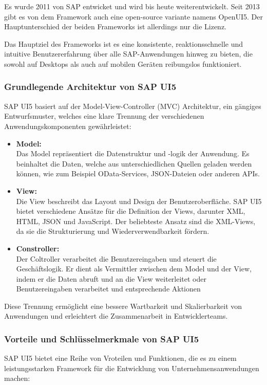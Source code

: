 Es wurde 2011 von SAP entwicket und wird bis heute weiterentwickelt. Seit 2013 gibt es von dem Framework auch eine open-source variante namens OpenUI5. Der Hauptunterschied der beiden Frameworks ist allerdings nur die Lizenz.

Das Hauptziel des Frameworks ist es eine konsistente, reaktionsschnelle und intuitive Benutzererfahrung über alle SAP-Anwendungen hinweg zu bieten, die sowohl auf Desktops als auch auf mobilen Geräten reibungslos funktioniert.

\subsubsection[Grundlegende Architektur von SAP UI5]{Grundlegende Architektur von SAP UI5}
SAP UI5 basiert auf der Model-View-Controller (MVC) Architektur, ein gängiges Entwurfsmuster, welches eine klare Trennung der verschiedenen Anwendungskomponenten gewährleistet:
\begin{itemize}
    \item \textbf{Model:} \\
    Das Model repräsentiert die Datenstruktur und -logik der Anwendung. Es beinhaltet die Daten, welche aus unterschiedlichen Quellen geladen werden können, wie zum Beispiel OData-Services, JSON-Dateien oder anderen APIs.
    \item \textbf{View:} \\
    Die View beschreibt das Layout und Design der Benutzeroberfläche. SAP UI5 bietet verschiedene Ansätze für die Definition der Views, darunter XML, HTML, JSON und JavaScript.
    Der beliebteste Ansatz sind die XML-Views, da sie die Strukturierung und Wiederverwendbarkeit fördern.
    \item \textbf{Constroller:} \\
    Der Coltroller verarbeitet die Benutzereingaben und steuert die Geschäftslogik.
    Er dient als Vermittler zwischen dem Model und der View, indem er die Daten abruft und an die View weiterleitet oder Benutzereingaben verarbeitet und entsprechende Aktionen 
\end{itemize}

Diese Trennung ermöglicht eine bessere Wartbarkeit und Skalierbarkeit von Anwendungen und erleichtert die Zusammenarbeit in Entwicklerteams.

\subsubsection[Vorteile und Schlüsselmerkmale von SAP UI5]{Vorteile und Schlüsselmerkmale von SAP UI5}
SAP UI5 bietet eine Reihe von Vroteilen und Funktionen, die es zu einem leistungsstarken Framework für die Entwicklung von Unternehmensanwendungen machen:

